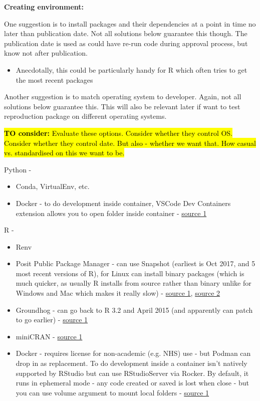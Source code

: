 \textbf{Creating environment:}

One suggestion is to install packages and their dependencies at a point in time no later than publication date. Not all solutions below guarantee this though. The publication date is used as could have re-run code during approval process, but know not after publication.
\begin{itemize}
    \item Anecdotally, this could be particularly handy for R which often tries to get the most recent packages
\end{itemize}

Another suggestion is to match operating system to developer. Again, not all solutions below guarantee this. This will also be relevant later if want to test reproduction package on different operating systems.

\hl{\textbf{TO consider:} Evaluate these options. Consider whether they control OS. Consider whether they control date. But also - whether we want that. How casual vs. standardised on this we want to be.}

Python -
\begin{itemize}
    \item Conda, VirtualEnv, etc.
    \item Docker - to do development inside container, VSCode Dev Containers extension allows you to open folder inside container - \href{https://code.visualstudio.com/docs/devcontainers/containers}{source 1}
\end{itemize}

R -
\begin{itemize}
    \item Renv
    \item Posit Public Package Manager - can use Snapshot (earliest is Oct 2017, and 5 most recent versions of R), for Linux can install binary packages (which is much quicker, as usually R installs from source rather than binary unlike for Windows and Mac which makes it really slow) - \href{https://packagemanager.posit.co/client/#/repos/cran/setup}{source 1}, \href{https://docs.posit.co/faq/p3m-faq/#frequently-asked-questions}{source 2}
    \item Groundhog - can go back to R 3.2 and April 2015 (and apparently can patch to go earlier) - \href{https://www.brodrigues.co/blog/2023-01-12-repro_r/}{source 1}
    \item miniCRAN - \href{https://learn.microsoft.com/en-us/sql/machine-learning/package-management/create-a-local-package-repository-using-minicran?view=sql-server-ver16}{source 1}
    \item Docker - requires license for non-academic (e.g. NHS) use - but Podman can drop in as replacement. To do development inside a container isn't natively supported by RStudio but can use RStudioServer via Rocker. By default, it runs in ephemeral mode - any code created or saved is lost when close - but you can use volume argument to mount local folders - \href{https://towardsdatascience.com/running-rstudio-inside-a-container-e9db5e809ff8}{source 1}
\end{itemize}

